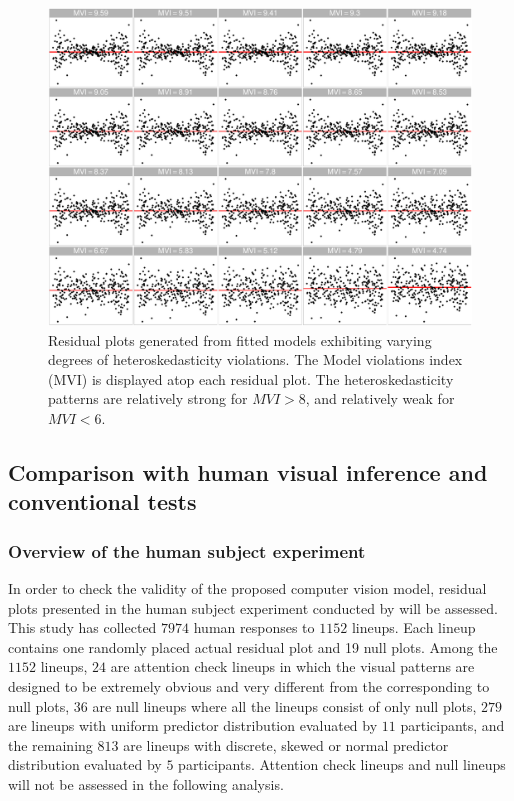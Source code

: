 \documentclass[]{interact}
\theoremstyle{plain}%
\theoremstyle{definition}
\theoremstyle{remark}
\begin{document}
\begin{figure}[!h]

{\centering \includegraphics[width=1\linewidth]{paper_files/figure-latex/heter-index-1} 

}

\caption{Residual plots generated from fitted models exhibiting varying degrees of heteroskedasticity violations. The Model violations index (MVI) is displayed atop each residual plot. The heteroskedasticity patterns are relatively strong for $MVI > 8$, and relatively weak for $MVI < 6$.}\label{fig:heter-index}
\end{figure}

\hypertarget{comparison-with-human-visual-inference-and-conventional-tests}{%
\subsection{Comparison with human visual inference and conventional
tests}\label{comparison-with-human-visual-inference-and-conventional-tests}}

\hypertarget{overview-of-the-human-subject-experiment}{%
\subsubsection{Overview of the human subject
experiment}\label{overview-of-the-human-subject-experiment}}

In order to check the validity of the proposed computer vision model,
residual plots presented in the human subject experiment conducted by
\citet{li2023plot} will be assessed. This study has collected \(7974\)
human responses to \(1152\) lineups. Each lineup contains one randomly
placed actual residual plot and 19 null plots. Among the \(1152\)
lineups, \(24\) are attention check lineups in which the visual patterns
are designed to be extremely obvious and very different from the
corresponding to null plots, \(36\) are null lineups where all the
lineups consist of only null plots, \(279\) are lineups with uniform
predictor distribution evaluated by \(11\) participants, and the
remaining \(813\) are lineups with discrete, skewed or normal predictor
distribution evaluated by \(5\) participants. Attention check lineups
and null lineups will not be assessed in the following analysis.
\end{document}
